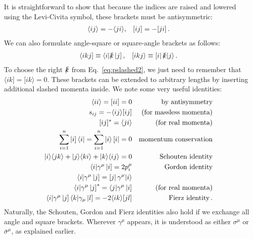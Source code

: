 \documentclass[main.tex]{subfiles}
\begin{document}
It is straightforward to show that because the indices are raised and lowered using the Levi-Civita symbol, these brackets must be antisymmetric:
\begin{align}
    \langle ij \rangle = -\langle ji \rangle, && [ ij ] = -[ ji ]\,.
\end{align}
We can also formulate angle-square or square-angle brackets as follows:
\begin{align}
    \langle ikj ] \equiv \langle i| \slashed{k} \left| j \right], && [ikj\rangle \equiv \left[ i \right| \slashed{k} |j \rangle\,.
\end{align}
To choose the right $\slashed{k}$ from Eq.~\ref{eq:pslashed2}, we just need to remember that $\langle ik] = [ik\rangle = 0$. These brackets can be extended to arbitrary lengths by inserting additional slashed momenta inside. We note some very useful identities:
\begin{subequations} \label{eq:spinorsids}
    \begin{align}
        \braket{ii} = \braketsq{ii} = 0 && \text{by antisymmetry} \label{eq:iieq0} \\
        s_{ij} = -\braket{ij}\braketsq{ij} && \text{(for massless momenta)} \\
        \braketsq{ij}^{\ast} = \braket{ji} && \text{(for real momenta)} \label{eq:complexconjbracket} \\
        \sum_{i=1}^n \ketsq{i}\bra{i} = \sum_{i=1}^n \ket{i}\brasq{i} = 0 && \text{momentum conservation} \label{eq:spinmomcons}\\
        \ket{i}\braket{jk} + \ket{j}\braket{ki} + \ket{k}\braket{ij} = 0 && \text{Schouten identity} \label{eq:schouten} \\
        \bra{i}\gamma^\mu \ketsq{i} = 2p_i^\mu && \text{Gordon identity} \label{eq:gordon} \\
        \bra{i} \gamma^\mu \ketsq{j} = \brasq{j}\gamma^\mu \ket{i} && \\
        \bra{i}\gamma^\mu \ketsq{j}^{\ast} = \bra{j}\gamma^\mu \ketsq{i} && \text{(for real momenta)} \\
        \bra{i}\gamma^\mu \ketsq{j} \bra{k}\gamma_\mu \ketsq{l} = -2\braket{ik}\braketsq{jl} && \text{Fierz identity} \label{eq:fierz} \,.
    \end{align}

\end{subequations}
Naturally, the Schouten, Gordon and Fierz identities also hold if we exchange all angle and square brackets. Wherever $\gamma^\mu$ appears, it is understood as either $\sigma^\mu$ or $\bar{\sigma}^\mu$, as explained earlier.
\end{document}

